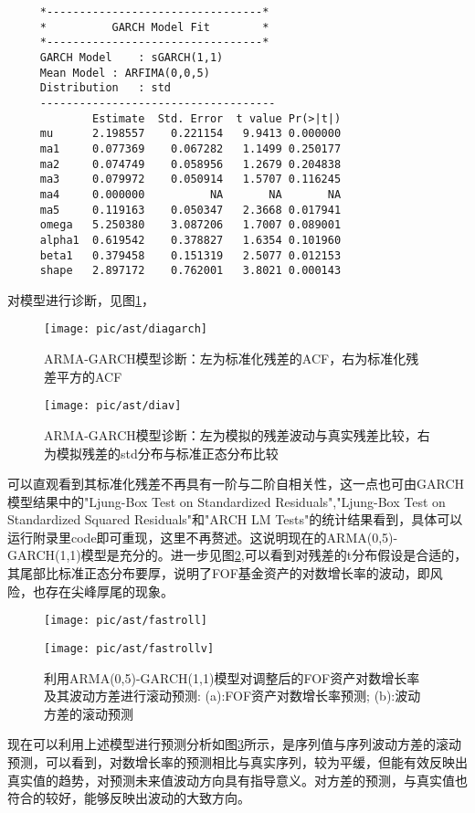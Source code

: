 \documentclass[10.5pt,onecolumn,a4paper]{article}%
\begin{document}
\begin{framed}
	\begin{verbatim}
	 *---------------------------------*                         
	 *          GARCH Model Fit        *                           
	 *---------------------------------*
	 GARCH Model	: sGARCH(1,1)
	 Mean Model	: ARFIMA(0,0,5)
	 Distribution	: std 
	 ------------------------------------
	         Estimate  Std. Error  t value Pr(>|t|)
	 mu      2.198557    0.221154   9.9413 0.000000                                  
	 ma1     0.077369    0.067282   1.1499 0.250177
	 ma2     0.074749    0.058956   1.2679 0.204838
	 ma3     0.079972    0.050914   1.5707 0.116245
	 ma4     0.000000          NA       NA       NA
	 ma5     0.119163    0.050347   2.3668 0.017941
	 omega   5.250380    3.087206   1.7007 0.089001
	 alpha1  0.619542    0.378827   1.6354 0.101960
	 beta1   0.379458    0.151319   2.5077 0.012153
	 shape   2.897172    0.762001   3.8021 0.000143
	\end{verbatim}
\end{framed}
对模型进行诊断，见图\ref{fig:diagarch}，
\begin{figure}[h!]
	\centering
	\texttt{[image: pic/ast/diagarch]}
	\caption{ARMA-GARCH模型诊断：左为标准化残差的ACF，右为标准化残差平方的ACF}
	\label{fig:diagarch}
\end{figure}
\begin{figure}[h!]
	\centering
	\texttt{[image: pic/ast/diav]}
	\caption{ARMA-GARCH模型诊断：左为模拟的残差波动与真实残差比较，右为模拟残差的std分布与标准正态分布比较}
	\label{fig:diav}
\end{figure}
可以直观看到其标准化残差不再具有一阶与二阶自相关性，这一点也可由GARCH模型结果中的"Ljung-Box Test on Standardized Residuals","Ljung-Box Test on Standardized Squared Residuals"和"ARCH LM Tests"的统计结果看到，具体可以运行附录里code即可重现，这里不再赘述。这说明现在的ARMA(0,5)-GARCH(1,1)模型是充分的。进一步见图\ref{fig:diav},可以看到对残差的t分布假设是合适的，其尾部比标准正态分布要厚，说明了FOF基金资产的对数增长率的波动，即风险，也存在尖峰厚尾的现象。
\begin{figure}[h!]
	\begin{minipage}[ht]{0.48\textwidth}
		\centering
		\texttt{[image: pic/ast/fastroll]}
		\subcaption{}\label{fastroll}
	\end{minipage}%
	\hspace{0.04\textwidth}
	\begin{minipage}[ht]{0.48\textwidth}
		\centering
		\texttt{[image: pic/ast/fastrollv]}
		\subcaption{}\label{fastrollv}
	\end{minipage}
	\caption{利用ARMA(0,5)-GARCH(1,1)模型对调整后的FOF资产对数增长率及其波动方差进行滚动预测: (a):FOF资产对数增长率预测; (b):波动方差的滚动预测} \label{f}
\end{figure}
\par 现在可以利用上述模型进行预测分析如图\ref{f}所示，是序列值与序列波动方差的滚动预测，可以看到，对数增长率的预测相比与真实序列，较为平缓，但能有效反映出真实值的趋势，对预测未来值波动方向具有指导意义。对方差的预测，与真实值也符合的较好，能够反映出波动的大致方向。
\end{document}
